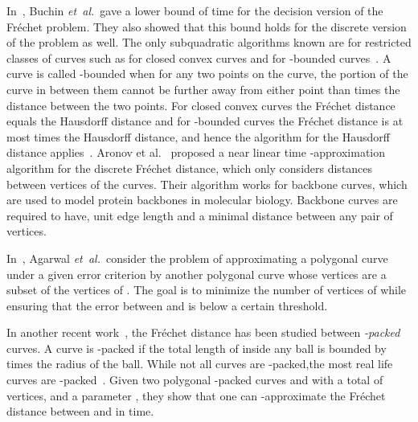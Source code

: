 \documentclass[12pt]{dalthesis}
\newcommand{\etal}{{\em et~al.\/}}
\newcommand{\REM}[1]{}
\newcommand{\Frechet}{Fr\'echet }
\begin{document}
In~\cite{LowerBound-FD}, Buchin \etal~gave a lower bound of  time for the decision version of the \Frechet problem.
They also showed that
this bound holds for 
the discrete version of the problem as well.
The only subquadratic algorithms known are for 
restricted classes of curves such as for closed
convex curves and for -bounded curves~\cite{Alt2003Comparison}. 
A curve is
called -bounded when
for any two points on the curve, 
the portion of the curve in between them cannot be further
away from either point than  times the distance between the two points. For closed convex
curves the \Frechet distance equals the Hausdorff distance and for -bounded curves the \Frechet
distance is at most  times the Hausdorff distance, and hence the  algorithm for
the Hausdorff distance applies~\cite{Alt2003Comparison}.
Aronov et al.~\cite{FDRevisited}  proposed a near linear time 
-approximation algorithm for the
discrete \Frechet distance, which only considers distances between vertices of the curves. Their
algorithm works for backbone curves, which are used to model protein backbones in molecular
biology. Backbone curves are required to have, 
unit edge length and a minimal distance
between any pair of vertices. 


In~\cite{Agarwal2002}, Agarwal \etal~consider the problem of approximating a polygonal curve 
 under a given error criterion by another polygonal curve  whose vertices are a subset of the vertices of . 
The goal is to minimize the number of vertices of  while ensuring that the error between  and  is 
below a certain threshold. 


In another recent work~\cite{c-packedFD},
the \Frechet distance has been studied between 
\emph{-packed} curves. 
A curve  is -packed if the total length of  inside any ball is bounded by  times the radius of the ball. 
While not all curves are -packed,the most real life curves are -packed~\cite{c-packedFD}.
Given two polygonal -packed curves  and  
with a total of  vertices, and
a parameter , 
they show that one can -approximate the \Frechet distance between  and  in
 time.











\REM{
Guibas \etal ~\cite{Guibas91approximatingpolygons}  solved the line simplification 
problem under several optimization criteria including \Frechet distance. 
They give an  time algorithm for finding  an 
approximation that consists of a minimum number of links 
that has \Frechet distance at most  to the original 
polygonal curve. 

Neyer~\cite{C-oriented} studies the C-oriented line simplification problem. 
Given a polygonal chain  represented by an ordered set of vertices  in the 
plane, a set of orientations C, and a constant , a "C-oriented"  
polygonal chain  is found 
which consists of the minimum number of line segments that has \Frechet distance at
most  to . 

}
\end{document}
